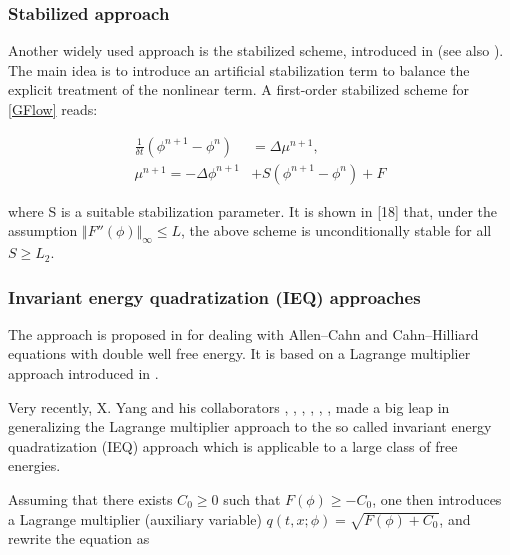 \documentclass{beamer}
\begin{document}
    \begin{frame}
    \frametitle{Stabilized approach}
Another widely used approach is the stabilized scheme, introduced in \cite{Zhu19993564} (see also \cite{Shen20101669}). The main idea is to introduce an artificial stabilization term to balance the explicit treatment of the nonlinear term. A first-order stabilized scheme for \ref{GFlow} reads:

\begin{equation}\label{Stabilized approach}
  \begin{split}
\frac{1}{\delta t}(\phi^{n+1}-\phi^n) &= \Delta \mu^{n+1},\\
\mu^{n+1} = -\Delta\phi^{n+1}&+S(\phi^{n+1}-\phi^n)+F
  \end{split}
\end{equation}

where S is a suitable stabilization parameter. It is shown in [18] that, under the assumption $\Vert F''(\phi)\Vert_\infty\leq L$, the above scheme is unconditionally stable for all $S \geq L_2$.

    \end{frame}
    \begin{frame}
    \frametitle{Invariant energy quadratization (IEQ) approaches}
	
The approach is proposed in \cite{Guillén-gonzález2013140} for dealing with Allen–Cahn and Cahn–Hilliard equations with double well free energy. It is based on a Lagrange multiplier approach introduced in \cite{Badia20111686}.


Very recently, X. Yang and his collaborators \cite{Yang2016294}, \cite{Yang2017691}, \cite{Yang2017104}, \cite{Yu2017665}, \cite{Zhao2017803}, \cite{Yang20171005}, \cite{doi:10.1142/S0218202517500373} made a big leap in generalizing the Lagrange multiplier approach to the so called invariant energy quadratization (IEQ) approach which is applicable to a large class of free energies.	
	
Assuming that there exists $C_0 \geq 0$ such that $F(\phi) \geq -C_0$, one then introduces a Lagrange multiplier (auxiliary variable) $q(t,x;\phi)=\sqrt{F(\phi)+C_0}$, and rewrite the equation as
	\end{frame}
\end{document}
